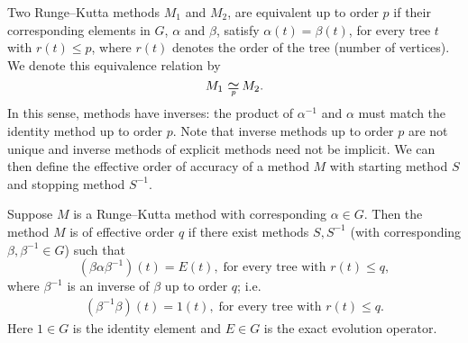 Two Runge--Kutta methods $M_1$ and $M_2$, are equivalent up to order
$p$ if their corresponding elements in $G$, $\alpha$ and $\beta$, satisfy
$\alpha(t) = \beta(t)$, for every tree $t$ with $r(t) \leq p$,
where $r(t)$ denotes the order of the tree (number of vertices).
We denote this equivalence relation by
$$M_1 \equival{p} M_2.$$
In this sense, methods have inverses: the product of $\alpha^{-1}$ and
$\alpha$ must match the identity method up to order $p$.
Note that inverse methods up to order $p$ are not unique and inverse 
methods of explicit methods need not be implicit.
We can then define the effective order of accuracy of a method $M$
with starting method $S$ and stopping method $S^{-1}$. %
\begin{definition}\cite[\S~389]{Butcher2008_book}\label{def:Effective_order}
  Suppose $M$ is a Runge--Kutta method with corresponding $\alpha \in G$.
  Then the method $M$ is of effective order $q$ if there exist methods
  $S,S^{-1}$ (with corresponding $\beta, \beta^{-1} \in G$) such that
	\begin{equation}\label{eq:Effective_order_1}
		(\beta\alpha\beta^{-1})(t) = E(t), \; \text{for every tree with } r(t) \leq q,
	\end{equation}
        where $\beta^{-1}$ is an inverse of $\beta$ up to order $q$; i.e.
        \begin{align*}
        		(\beta^{-1}\beta)(t) = 1(t), \; \text{for every tree with } r(t) \leq q.
		\end{align*}	        
        Here $1\in G$ is the identity element
        and $E\in G$ is the exact evolution operator.
\end{definition}

